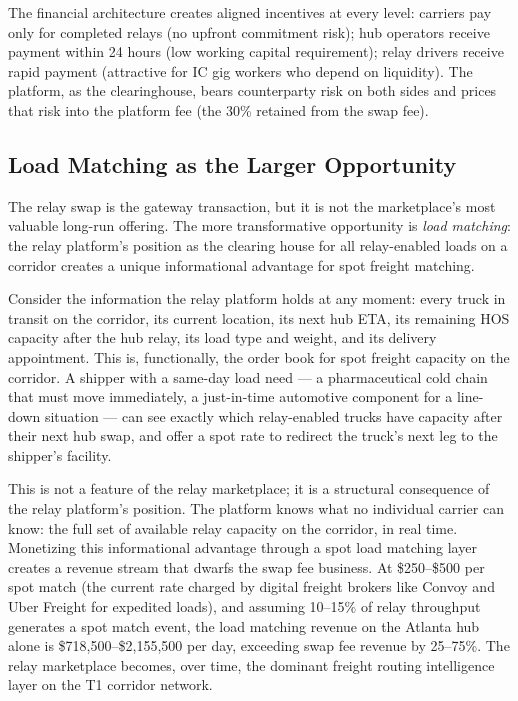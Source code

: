 The financial architecture creates aligned incentives at every level: carriers pay only for completed relays (no upfront commitment risk); hub operators receive payment within 24 hours (low working capital requirement); relay drivers receive rapid payment (attractive for IC gig workers who depend on liquidity). The platform, as the clearinghouse, bears counterparty risk on both sides and prices that risk into the platform fee (the 30\% retained from the swap fee).

\subsection{Load Matching as the Larger Opportunity}

The relay swap is the gateway transaction, but it is not the marketplace's most valuable long-run offering. The more transformative opportunity is \textit{load matching}: the relay platform's position as the clearing house for all relay-enabled loads on a corridor creates a unique informational advantage for spot freight matching.

Consider the information the relay platform holds at any moment: every truck in transit on the corridor, its current location, its next hub ETA, its remaining HOS capacity after the hub relay, its load type and weight, and its delivery appointment. This is, functionally, the order book for spot freight capacity on the corridor. A shipper with a same-day load need --- a pharmaceutical cold chain that must move immediately, a just-in-time automotive component for a line-down situation --- can see exactly which relay-enabled trucks have capacity after their next hub swap, and offer a spot rate to redirect the truck's next leg to the shipper's facility.

This is not a feature of the relay marketplace; it is a structural consequence of the relay platform's position. The platform knows what no individual carrier can know: the full set of available relay capacity on the corridor, in real time. Monetizing this informational advantage through a spot load matching layer creates a revenue stream that dwarfs the swap fee business. At \$250--\$500 per spot match (the current rate charged by digital freight brokers like Convoy and Uber Freight for expedited loads), and assuming 10--15\% of relay throughput generates a spot match event, the load matching revenue on the Atlanta hub alone is \$718,500--\$2,155,500 per day, exceeding swap fee revenue by 25--75\%. The relay marketplace becomes, over time, the dominant freight routing intelligence layer on the T1 corridor network.

